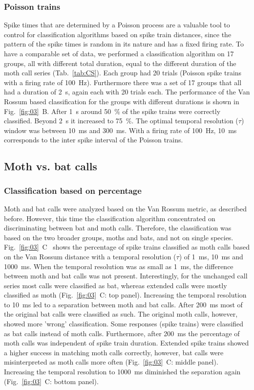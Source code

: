 \documentclass[12pt,a4paper]{article}
\newcommand{\fig}[2]{(Fig.~#1~#2)}
\newcommand{\percent}[1]{#1~$\%$}
\begin{document}
\subsubsection{Poisson trains}
Spike times that are determined by a Poisson process are a valuable tool to control for classification algorithms based on spike train distances, since the pattern of the spike times is random in its nature and has a fixed firing rate.
To have a comparable set of data, we performed a classification algorithm on 17 groups, all with different total duration, equal to the different duration of the moth call series (Tab.~\ref{tab:CS}). Each group had 20 trials (Poisson spike trains with a firing rate of 100~Hz). Furthermore there was a set of 17 groups that all had a duration of 2~s, again each with 20 trials each. The performance of the Van Rossum based classification for the groups with different durations is shown in Fig.~\ref{fig:03}~B. After 1~s around \percent{50} of the spike trains were correctly classified. Beyond 2~s it increased to \percent{75}. The optimal temporal resolution ($ \tau $) window was between 10~ms and 300~ms. With a firing rate of 100~Hz, 10~ms corresponds to the inter spike interval of the Poisson trains.

\subsection{Moth vs. bat calls}
\subsubsection{Classification based on percentage}
Moth and bat calls were analyzed based on the Van Rossum metric, as described before. However, this time the classification algorithm concentrated on discriminating between bat and moth calls. Therefore, the classification was based on the two broader groups, moths and bats, and not on single species. 
Fig.~\ref{fig:03}~C~ shows the percentage of spike trains classified as moth calls based on the Van Rossum distance with a temporal resolution ($ \tau $) of 1~ms, 10~ms and 1000~ms. 
When the temporal resolution was as small as 1~ms, the difference between moth and bat calls was not present. Interestingly, for the unchanged call series most calls were classified as bat, whereas extended calls were mostly classified as moth \fig{\ref{fig:03}}{C: top panel}. 
Increasing the temporal resolution to 10~ms led to a separation between moth and bat calls. 
After 200~ms most of the original bat calls were classified as such. The original moth calls, however, showed more 'wrong' classification. Some responses (spike trains) were classified as bat calls instead of moth calls. Furthermore, after 200~ms the percentage of moth calls was independent of spike train duration. Extended spike trains showed a higher success in matching moth calls correctly, however, bat calls were misinterpreted as moth calls more often \fig{\ref{fig:03}}{C: middle panel}. Increasing the temporal resolution to 1000~ms diminished the separation again \fig{\ref{fig:03}}{C: bottom panel}.
\end{document}
